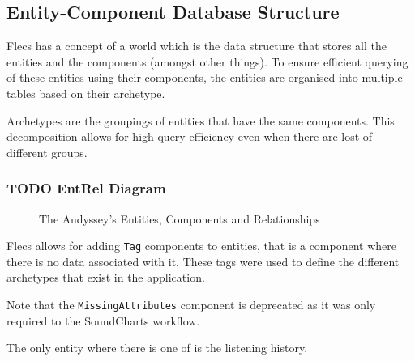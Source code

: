 \subsection{Entity-Component Database Structure}
Flecs has a concept of a world which is the data structure that stores all the entities and the components (amongst other things). To ensure efficient querying of these entities using their components, the entities are organised into multiple tables based on their archetype.

Archetypes are the groupings of entities that have the same components. This decomposition allows for high query efficiency even when there are lost of different groups. 

\subsubsection{TODO EntRel Diagram}
\begin{figure}
    \caption{The Audyssey's Entities, Components and Relationships}
\end{figure}

Flecs allows for adding \texttt{Tag} components to entities, that is a component where there is no data associated with it. These tags were used to define the different archetypes that exist in the application.

Note that the \texttt{MissingAttributes} component is deprecated as it was only required to the SoundCharts workflow.

The only entity where there is one of is the listening history.

